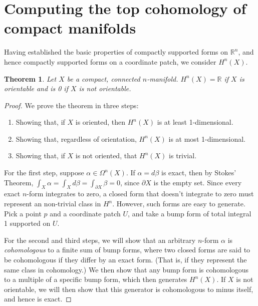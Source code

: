 \documentclass[12pt]{amsbook}
\newcommand{\R}{{\mathbb R}}
\newtheorem{thm}{Theorem}[section]
\theoremstyle{definition}
\begin{document}
\section{Computing the top cohomology of compact manifolds}

Having established the basic properties of compactly supported forms
on $\R^n$, and hence compactly supported forms on a coordinate patch,
we consider $H^n(X)$.

\begin{thm} Let $X$ be a compact, connected $n$-manifold. 
$H^n(X) = \R$ if $X$ is orientable and is 0 if $X$ is not orientable. \end{thm}

\begin{proof}
We prove the theorem in three steps:
\begin{enumerate}
\item Showing that, if $X$ is oriented, then $H^n(X)$ is at least 1-dimensional.
\item Showing that, regardless of orientation, $H^n(X)$ is at most 1-dimensional. 
\item Showing that, if $X$ is not oriented, that $H^n(X)$ is trivial. 
\end{enumerate} 

For the first step, suppose $\alpha \in \Omega^n(X)$. If $\alpha =
d\beta$ is exact, then by Stokes' Theorem, $\int_X \alpha = \int_X d
\beta = \int_{\partial X} \beta = 0$, since $\partial X$ is the empty
set.  Since every exact $n$-form integrates to zero, a closed form
that doesn't integrate to zero must represent an non-trivial class in
$H^n$. However, such forms are easy to generate. Pick a point $p$ and
a coordinate patch $U$, and take a bump form of total integral 1
supported on $U$.

For the second and third steps, we will show that an arbitrary $n$-form $\alpha$
is {\em cohomologous} to a finite sum of bump forms, where two closed
forms are said to be cohomologous if they differ by an exact
form. (That is, if they represent the same class in cohomology.) We then
show that any bump form is cohomologous to a multiple of a specific
bump form, which then generates $H^n(X)$. If $X$ is not orientable, we
will then show that this generator is cohomologous to minus
itself, and hence is exact.


\end{proof}
\end{document}

